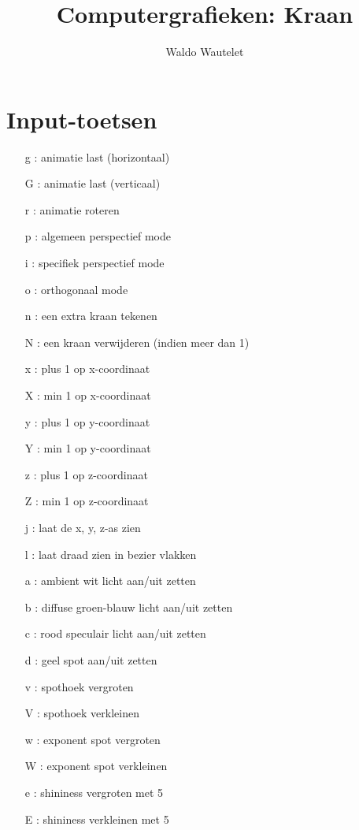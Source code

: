 \documentclass[a4paper, 12pt, one column]{article}
\title{Computergrafieken: Kraan}
\author{Waldo Wautelet}
\begin{document}
\maketitle

\section{Input-toetsen}

\begin{itemize}
    \setlength\itemsep{0em}
    \item [g]: animatie last (horizontaal)
    \item [G]: animatie last (verticaal)
    \item [r]: animatie roteren
    \item [p]: algemeen perspectief mode
    \item [i]: specifiek perspectief mode
    \item [o]: orthogonaal mode
    \item [n]: een extra kraan tekenen
    \item [N]: een kraan verwijderen (indien meer dan 1)
    \item [x]: plus 1 op x-coordinaat
    \item [X]: min  1 op x-coordinaat
    \item [y]: plus 1 op y-coordinaat
    \item [Y]: min  1 op y-coordinaat
    \item [z]: plus 1 op z-coordinaat
    \item [Z]: min  1 op z-coordinaat
    \item [j]: laat de x, y, z-as zien
    \item [l]: laat draad zien in bezier vlakken
    \item [a]: ambient wit licht aan/uit zetten
    \item [b]: diffuse groen-blauw licht aan/uit zetten
    \item [c]: rood speculair licht aan/uit zetten
    \item [d]: geel spot aan/uit zetten
    \item [v]: spothoek vergroten
    \item [V]: spothoek verkleinen
    \item [w]: exponent spot vergroten
    \item [W]: exponent spot verkleinen
    \item [e]: shininess vergroten met 5
    \item [E]: shininess verkleinen met 5

\end{itemize}
\end{document}
